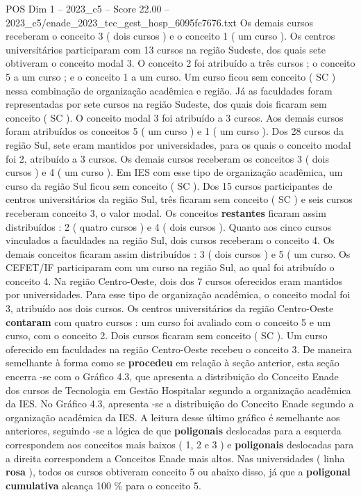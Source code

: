 \begin{textsample}{POS Dim 1 – 2023\_c5 – Score 22.00 – 2023\_c5/enade\_2023\_tec\_gest\_hosp\_6095fc7676.txt}
Os demais cursos receberam o conceito 3 ( dois cursos ) e o conceito 1 ( um curso ).
Os centros universitários participaram com 13 cursos na região Sudeste, dos quais sete obtiveram o conceito modal 3.
O conceito 2 foi atribuído a três cursos ; o conceito 5 a um curso ; e o conceito 1 a um curso.
Um curso ficou sem conceito ( SC ) nessa combinação de organização acadêmica e região.
Já as faculdades foram representadas por sete cursos na região Sudeste, dos quais dois ficaram sem conceito ( SC ).
O conceito modal 3 foi atribuído a 3 cursos.
Aos demais cursos foram atribuídos os conceitos 5 ( um curso ) e 1 ( um curso ).
Dos 28 cursos da região Sul, sete eram mantidos por universidades, para os quais o conceito modal foi 2, atribuído a 3 cursos.
Os demais cursos receberam os conceitos 3 ( dois cursos ) e 4 ( um curso ).
Em IES com esse tipo de organização acadêmica, um curso da região Sul ficou sem conceito ( SC ).
Dos 15 cursos participantes de centros universitários da região Sul, três ficaram sem conceito ( SC ) e seis cursos receberam conceito 3, o valor modal.
Os conceitos \textbf{restantes} ficaram assim distribuídos : 2 ( quatro cursos ) e 4 ( dois cursos ).
Quanto aos cinco cursos vinculados a faculdades na região Sul, dois cursos receberam o conceito 4.
Os demais conceitos ficaram assim distribuídos : 3 ( dois cursos ) e 5 ( um curso.
Os CEFET/IF participaram com um curso na região Sul, ao qual foi atribuído o conceito 4.
Na região Centro-Oeste, dois dos 7 cursos oferecidos eram mantidos por universidades.
Para esse tipo de organização acadêmica, o conceito modal foi 3, atribuído aos dois cursos.
Os centros universitários da região Centro-Oeste \textbf{contaram} com quatro cursos : um curso foi avaliado com o conceito 5 e um curso, com o conceito 2.
Dois cursos ficaram sem conceito ( SC ).
Um curso oferecido em faculdades na região Centro-Oeste recebeu o conceito 3.
De maneira semelhante à forma como se \textbf{procedeu} em relação à seção anterior, esta seção encerra -se com o Gráfico 4.3, que apresenta a distribuição do Conceito Enade dos cursos de Tecnologia em Gestão Hospitalar segundo a organização acadêmica da IES.
No Gráfico 4.3, apresenta -se a distribuição do Conceito Enade segundo a organização acadêmica da IES.
A leitura desse último gráfico é semelhante aos anteriores, seguindo -se a lógica de que \textbf{poligonais} deslocadas para a esquerda correspondem aos conceitos mais baixos ( 1, 2 e 3 ) e \textbf{poligonais} deslocadas para a direita correspondem a Conceitos Enade mais altos.
Nas universidades ( linha \textbf{rosa} ), todos os cursos obtiveram conceito 5 ou abaixo disso, já que a \textbf{poligonal} \textbf{cumulativa} alcança 100 \% para o conceito 5.

\end{textsample}
